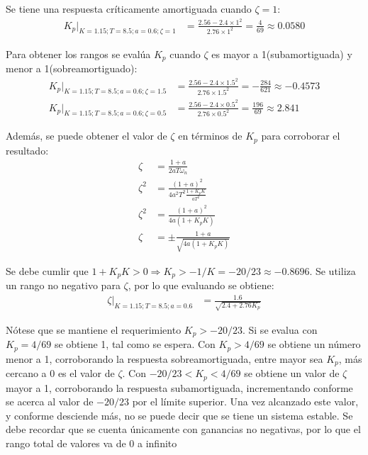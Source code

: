 \begin{ejercicio}
\begin{itemize}
    Se tiene una respuesta críticamente amortiguada cuando $\zeta = 1$:
    \begin{align*}
      K_p|_{K=1.15; T=8.5; a=0.6; \zeta=1} &= \frac{2.56 - 2.4 \times 1^2 }{2.76 \times 1^2 } = \frac{4}{69} \approx 0.0580
    \end{align*}

    Para obtener los rangos se evalúa $K_p$ cuando $\zeta$ es mayor a 1(subamortiguada) y menor a 1(sobreamortiguado):
    \begin{align*}
      K_p|_{K=1.15; T=8.5; a=0.6; \zeta=1.5} &= \frac{2.56 - 2.4 \times 1.5^2 }{2.76 \times 1.5^2 } = -\frac{284}{621} \approx -0.4573
      \\
      K_p|_{K=1.15; T=8.5; a=0.6; \zeta=0.5} &= \frac{2.56 - 2.4 \times 0.5^2 }{2.76 \times 0.5^2 } = \frac{196}{69} \approx 2.841
    \end{align*}

    Además, se puede obtener el valor de $\zeta$ en términos de $K_p$ para corroborar el resultado:
    \begin{align*}
      \zeta &= \frac{1+a}{2aT\omega_n}
      \\
      \zeta^2 &= \frac{(1+a)^2}{4 a^2 T^2 \frac{1 + K_p K}{aT^2}}
      \\
      \zeta^2 &= \frac{(1+a)^2}{4 a (1 + K_p K)}
      \\
      \zeta &= \pm\frac{1+a}{\sqrt{4 a (1 + K_p K)}}
    \end{align*}

    Se debe cumlir que $1+K_p K > 0 \Rightarrow K_p > -1/K = -20/23 \approx -0.8696$.
    Se utiliza un rango no negativo para $\zeta$, por lo que evaluando se obtiene:
      \begin{align*}
      \zeta|_{K=1.15; T=8.5; a=0.6} &= \frac{1.6}{\sqrt{2.4 + 2.76 K_p}}
    \end{align*}

    Nótese que se mantiene el requerimiento $K_p > -20/23$. Si se evalua con $K_p = 4/69$ se obtiene 1, tal como se espera. Con $K_p>4/69$ se obtiene un número menor a 1, corroborando la respuesta sobreamortiguada, entre mayor sea $K_p$, más cercano a 0 es el valor de $\zeta$. Con $-20/23<K_p<4/69$ se obtiene un valor de $\zeta$ mayor a 1, corroborando la respuesta subamortiguada, incrementando conforme se acerca al valor de $-20/23$ por el límite superior. Una vez alcanzado este valor, y conforme desciende más, no se puede decir que se tiene un sistema estable. Se debe recordar que se cuenta únicamente con ganancias no negativas, por lo que el rango total de valores va de 0 a infinito


\end{itemize}
\end{ejercicio}
